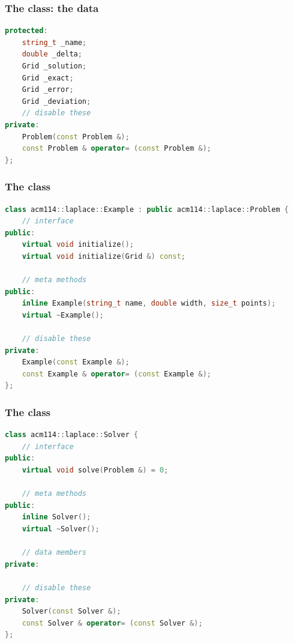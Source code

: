 \begin{frame}[fragile]
% 
  \frametitle{The  class: the data}
%
  \begin{lstlisting}[language=c++,name=Problem]
protected:
    string_t _name;
    double _delta;
    Grid _solution;
    Grid _exact;
    Grid _error;
    Grid _deviation;
    // disable these
private:
    Problem(const Problem &);
    const Problem & operator= (const Problem &);
};
  \end{lstlisting}
%
\end{frame}

\begin{frame}[fragile]
% 
  \frametitle{The  class}
%
  \begin{lstlisting}[language=c++]
class acm114::laplace::Example : public acm114::laplace::Problem {
    // interface
public:
    virtual void initialize();
    virtual void initialize(Grid &) const;

    // meta methods
public:
    inline Example(string_t name, double width, size_t points);
    virtual ~Example();

    // disable these
private:
    Example(const Example &);
    const Example & operator= (const Example &);
};

  \end{lstlisting}
%
\end{frame}

\begin{frame}[fragile]
% 
  \frametitle{The  class}
%
  \begin{lstlisting}[language=c++]
class acm114::laplace::Solver {
    // interface
public:
    virtual void solve(Problem &) = 0;

    // meta methods
public:
    inline Solver();
    virtual ~Solver();

    // data members
private:

    // disable these
private:
    Solver(const Solver &);
    const Solver & operator= (const Solver &);
};

  \end{lstlisting}
%
\end{frame}

